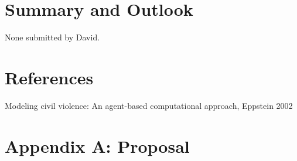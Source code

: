 \documentclass[11pt]{article}
\begin{document}
\newpage

\section{Summary and Outlook}

None submitted by David.

\newpage

\section{References}

Modeling civil violence: An agent-based computational approach, Eppstein 2002

\section{Appendix A: Proposal}
\end{document}
